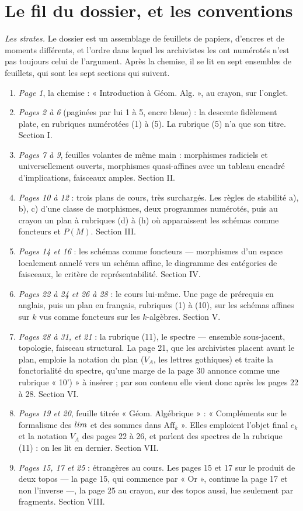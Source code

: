 \documentclass[11pt,a4paper]{article}
\begin{document}
\section*{Le fil du dossier, et les conventions}

\emph{Les strates.} Le dossier est un assemblage de feuillets de papiers, d'encres
et de moments différents, et l'ordre dans lequel les archivistes les ont
numérotés n'est pas toujours celui de l'argument. Après la chemise, il se lit
en sept ensembles de feuillets, qui sont les sept sections qui suivent.

\begin{enumerate}
  \item \emph{Page 1}, la chemise : « Introduction à Géom. Alg. », au crayon,
  sur l'onglet.
  \item \emph{Pages 2 à 6} (paginées par lui 1 à 5, encre bleue) : la descente
  fidèlement plate, en rubriques numérotées (1) à (5). La rubrique (5) n'a que
  son titre. Section I.
  \item \emph{Pages 7 à 9}, feuilles volantes de même main : morphismes
  radiciels et universellement ouverts, morphismes quasi-affines avec un tableau
  encadré d'implications, faisceaux amples. Section II.
  \item \emph{Pages 10 à 12} : trois plans de cours, très surchargés. Les
  règles de stabilité a), b), c) d'une classe de morphismes, deux programmes
  numérotés, puis au crayon un plan à rubriques (d) à (h) où apparaissent les
  schémas comme foncteurs et $P(M)$. Section III.
  \item \emph{Pages 14 et 16} : les schémas comme foncteurs --- morphismes
  d'un espace localement annelé vers un schéma affine, le diagramme des
  catégories de faisceaux, le critère de représentabilité. Section IV.
  \item \emph{Pages 22 à 24 et 26 à 28} : le cours lui-même. Une page de
  prérequis en anglais, puis un plan en français, rubriques (1) à (10), sur les
  schémas affines sur $k$ vus comme foncteurs sur les $k$-algèbres. Section V.
  \item \emph{Pages 28 à 31, et 21} : la rubrique (11), le spectre ---
  ensemble sous-jacent, topologie, faisceau structural. La page 21, que les
  archivistes placent avant le plan, emploie la notation du plan ($V_A$, les
  lettres gothiques) et traite la fonctorialité du spectre, qu'une marge de la
  page 30 annonce comme une rubrique « 10') » à insérer ; par son contenu elle
  vient donc après les pages 22 à 28. Section VI.
  \item \emph{Pages 19 et 20}, feuille titrée « Géom. Algébrique » :
  « Compléments sur le formalisme des $\varprojlim$ et des sommes dans
  $\mathrm{Aff}_k$ ». Elles emploient l'objet final $e_k$ et la notation $V_A$
  des pages 22 à 26, et parlent des spectres de la rubrique (11) : on les lit en
  dernier. Section VII.
  \item \emph{Pages 15, 17 et 25} : étrangères au cours. Les pages 15 et 17 sur
  le produit de deux topos --- la page 15, qui commence par « Or », continue la
  page 17 et non l'inverse ---, la page 25 au crayon, sur des topos aussi, lue
  seulement par fragments. Section VIII.
\end{enumerate}
\end{document}
